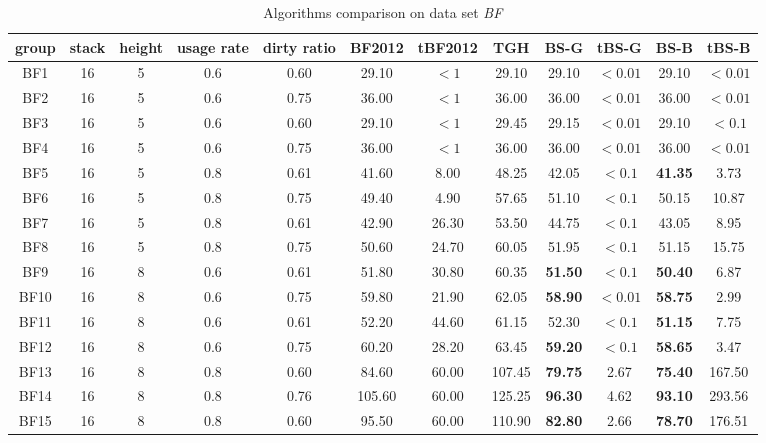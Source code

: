 \documentclass[review,3p,times,authoryear,12pt]{elsarticle}
\begin{document}
\begin{table}[htbp]
\caption{\label{tab:bf} Algorithms comparison on data set {\em BF}}
\footnotesize
\begin{tabular}{c|c|c|c|c|c|c|c|c|c|c|c}
  \hline
  group & stack & height & usage rate & dirty ratio & BF2012 & tBF2012 & TGH   & BS-G  & tBS-G & BS-B  & tBS-B \\
    \hline
    BF1   & 16    & 5     & 0.6   & 0.60  & 29.10  & $<1$  & 29.10  & 29.10  & $<0.01$ & 29.10  & $<0.01$ \\
    BF2   & 16    & 5     & 0.6   & 0.75  & 36.00  & $<1$  & 36.00  & 36.00  & $<0.01$ & 36.00  & $<0.01$ \\
    BF3   & 16    & 5     & 0.6   & 0.60  & 29.10  & $<1$  & 29.45  & 29.15  & $<0.01$ & 29.10  & $<0.1$ \\
    BF4   & 16    & 5     & 0.6   & 0.75  & 36.00  & $<1$  & 36.00  & 36.00  & $<0.01$ & 36.00  & $<0.01$ \\
    BF5   & 16    & 5     & 0.8   & 0.61  & 41.60  & 8.00  & 48.25  & 42.05  & $<0.1$  & \textbf{41.35}  & 3.73  \\
    BF6   & 16    & 5     & 0.8   & 0.75  & 49.40  & 4.90  & 57.65  & 51.10  & $<0.1$  & 50.15  & 10.87  \\
    BF7   & 16    & 5     & 0.8   & 0.61  & 42.90  & 26.30 & 53.50  & 44.75  & $<0.1$  & 43.05  & 8.95  \\
    BF8   & 16    & 5     & 0.8   & 0.75  & 50.60  & 24.70 & 60.05  & 51.95  & $<0.1$  & 51.15  & 15.75  \\
    BF9   & 16    & 8     & 0.6   & 0.61  & 51.80  & 30.80 & 60.35  & \textbf{51.50}  & $<0.1$  & \textbf{50.40}  & 6.87  \\
    BF10  & 16    & 8     & 0.6   & 0.75  & 59.80  & 21.90 & 62.05  & \textbf{58.90}  & $<0.01$ & \textbf{58.75}  & 2.99  \\
    BF11  & 16    & 8     & 0.6   & 0.61  & 52.20  & 44.60 & 61.15  & 52.30  & $<0.1$  & \textbf{51.15}  & 7.75  \\
    BF12  & 16    & 8     & 0.6   & 0.75  & 60.20  & 28.20 & 63.45  & \textbf{59.20}  & $<0.1$  & \textbf{58.65}  & 3.47  \\
    BF13  & 16    & 8     & 0.8   & 0.60  & 84.60  & 60.00 & 107.45 & \textbf{79.75 } & 2.67    & \textbf{75.40}  & 167.50  \\
    BF14  & 16    & 8     & 0.8   & 0.76  & 105.60 & 60.00 & 125.25 & \textbf{96.30}  & 4.62    & \textbf{93.10}  & 293.56  \\
    BF15  & 16    & 8     & 0.8   & 0.60  & 95.50  & 60.00 & 110.90 & \textbf{82.80 } & 2.66    & \textbf{78.70}  & 176.51  \\

\end{tabular}
\end{table}
\end{document}
